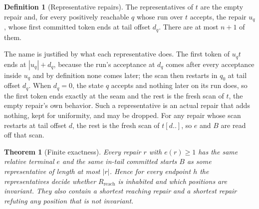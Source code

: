\documentclass[11pt,a4paper]{article}
\theoremstyle{definition}
\newtheorem{definition}{Definition}
\theoremstyle{plain}
\newtheorem{theorem}{Theorem}
\theoremstyle{remark}
\newcommand{\Rreach}{R_{\mathrm{reach}}}
\newcommand{\suffix}[2]{#1[#2..]}
\begin{document}
\begin{definition}[Representative repairs]
\label{def:representatives}
The representatives of $t$ are the empty repair and, for every positively reachable $q$ whose run over $t$ accepts, the
repair $u_q$, whose first committed token ends at tail offset $d_q$. There are at most $n + 1$ of them.
\end{definition}

The name is justified by what each representative does. The first token of $u_q t$ ends at $|u_q| + d_q$, because the
run's acceptance at $d_q$ comes after every acceptance inside $u_q$ and by definition none comes later; the scan then
restarts in $q_0$ at tail offset $d_q$. When $d_q = 0$, the state $q$ accepts and nothing later on its run does, so the
first token ends exactly at the seam and the rest is the fresh scan of $t$, the empty repair's own behavior. Such a
representative is an actual repair that adds nothing, kept for uniformity, and may be dropped. For any repair whose scan
restarts at tail offset $d$, the rest is the fresh scan of $\suffix{t}{d}$, so $e$ and $B$ are read off that scan.

\begin{theorem}[Finite exactness]
\label{thm:finite}
Every repair $r$ with $e(r) \ge 1$ has the same relative terminal $e$ and the same in-tail committed starts $B$ as some
representative of length at most $|r|$. Hence for every endpoint $h$ the representatives decide whether $\Rreach$ is
inhabited and which positions are invariant. They also contain a shortest reaching repair and a shortest repair refuting
any position that is not invariant.
\end{theorem}
\end{document}
